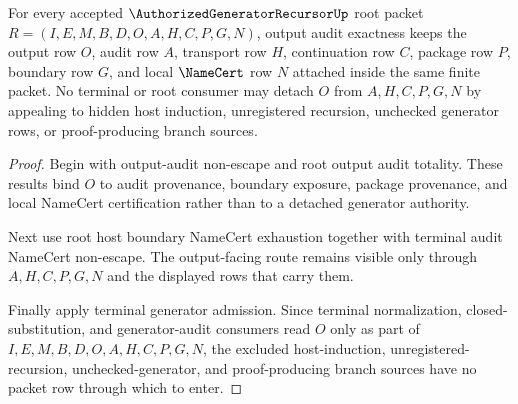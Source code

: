 \begin{theorem}
\label{thm:authorized-generator-recursor-root-output-audit-exactness}
For every accepted $\AuthorizedGeneratorRecursorUp$ root packet $R=(I,E,M,B,D,O,A,H,C,P,G,N)$, output audit exactness keeps the output row $O$, audit row $A$, transport row $H$, continuation row $C$, package row $P$, boundary row $G$, and local $\NameCert$ row $N$ attached inside the same finite packet. No terminal or root consumer may detach $O$ from $A,H,C,P,G,N$ by appealing to hidden host induction, unregistered recursion, unchecked generator rows, or proof-producing branch sources.
\end{theorem}
\begin{proof}
Begin with output-audit non-escape and root output audit totality. These results bind $O$ to audit provenance, boundary exposure, package provenance, and local NameCert certification rather than to a detached generator authority.

Next use root host boundary NameCert exhaustion together with terminal audit NameCert non-escape. The output-facing route remains visible only through $A,H,C,P,G,N$ and the displayed rows that carry them.

Finally apply terminal generator admission. Since terminal normalization, closed-substitution, and generator-audit consumers read $O$ only as part of $I,E,M,B,D,O,A,H,C,P,G,N$, the excluded host-induction, unregistered-recursion, unchecked-generator, and proof-producing branch sources have no packet row through which to enter.
\end{proof}

